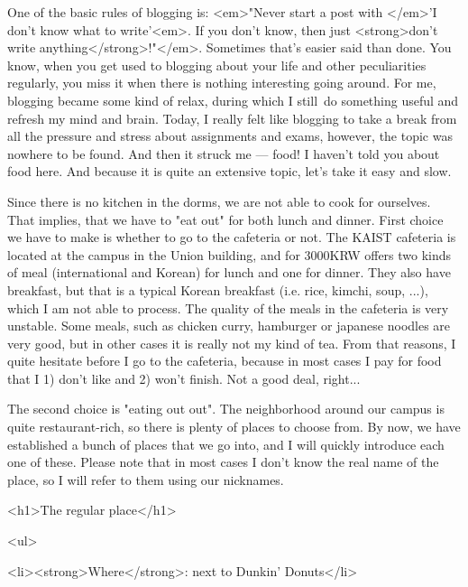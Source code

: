 \begin{post}
	\begin{content}
One of the basic rules of blogging is: <em>"Never start a post with </em>'I don't know what to write'<em>. If you don't know, then just <strong>don't write anything</strong>!"</em>. Sometimes that's easier said than done. You know, when you get used to blogging about your life and other peculiarities regularly, you miss it when there is nothing interesting going around. For me, blogging became some kind of relax, during which I still do something useful and refresh my mind and brain. Today, I really felt like blogging to take a break from all the pressure and stress about assignments and exams, however, the topic was nowhere to be found. And then it struck me — food! I haven't told you about food here. And because it is quite an extensive topic, let's take it easy and slow.



Since there is no kitchen in the dorms, we are not able to cook for ourselves. That implies, that we have to "eat out" for both lunch and dinner. First choice we have to make is whether to go to the cafeteria or not. The KAIST cafeteria is located at the campus in the Union building, and for 3000KRW offers two kinds of meal (international and Korean) for lunch and one for dinner. They also have breakfast, but that is a typical Korean breakfast (i.e. rice, kimchi, soup, ...), which I am not able to process. The quality of the meals in the cafeteria is very unstable. Some meals, such as chicken curry, hamburger or japanese noodles are very good, but in other cases it is really not my kind of tea. From that reasons, I quite hesitate before I go to the cafeteria, because in most cases I pay for food that I 1) don't like and 2) won't finish. Not a good deal, right...



The second choice is "eating out out". The neighborhood around our campus is quite restaurant-rich, so there is plenty of places to choose from. By now, we have established a bunch of places that we go into, and I will quickly introduce each one of these. Please note that in most cases I don't know the real name of the place, so I will refer to them using our nicknames.

<h1>The regular place</h1>

<ul>

	<li><strong>Where</strong>: next to Dunkin' Donuts</li>


\end{content}
\end{post}
